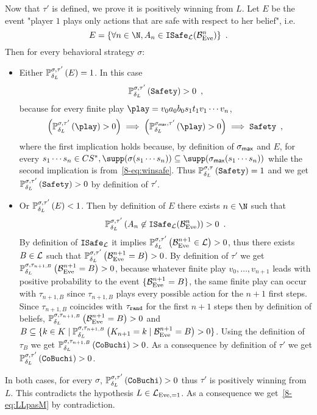 Now that $\tau'$ is defined, we prove it is positively winning from $L$.
Let $E$ be the event 
{"player $1$ plays only actions that are safe with respect to her belief", i.e.}
\[
E = \{ \forall n\in \N, A_n \in \Isafe_\LL(\belun^n)\}\enspace.
\]
Then for every behavioral strategy $\sigma$:
\begin{itemize}
  \item[\textbullet]
Either $\mathbb{P}^{\sigma,\tau'}_{\delta_L}\left({E}\right)=1$. In this case 
\[
\mathbb{P}^{\sigma,\tau'}_{\delta_L}\left({{\tt Safety}}\right)> 0\enspace,
\]
because for every {finite play $\play=v_0a_0b_0s_1t_1v_1\cdots v_n$,}
\[
\left(\probimp{\sigma,\tau'}{\delta_L}{\play} > 0\right)
\implies
\left(\probimp{\sigma_{\can},\tau'}{\delta_L}{\play} > 0\right)
\implies
\winsafe\enspace,
\]
where the first implication holds because, by definition of $\sigma_{\textsf{max}}$ and $E$,
for every $s_1\cdots s_n\in CS^*, \supp(\sigma(s_1\cdots s_n))\subseteq \supp(\sigma_{\can}(s_1\cdots s_n))$
while the second implication is from~\cref{8-eq:winsafe}.
Thus $\mathbb{P}^{\sigma,\tau}_{\delta_L}\left({{\tt Safety}}\right)= 1$ and we get
$\mathbb{P}^{\sigma,\tau'}_{\delta_L}\left({{\tt Safety}}\right) > 0$ by definition of
$\tau'$.
\item[\textbullet]
Or $\mathbb{P}^{\sigma,\tau'}_{\delta_L}\left({E}\right)<1$.
Then by definition of $E$ there exists $n\in\N$
such that 
\[
\mathbb{P}^{\sigma,\tau'}_{\delta_L}\left({A_n  \not\in
{\tt ISafe}_{\mathcal{L}}(\mathcal{B}_{\text{Eve}}^n)}\right)>0\enspace.
\]
{
By definition of ${\tt ISafe}_{\mathcal{L}}$ it implies
$\mathbb{P}^{\sigma,\tau'}_{\delta_L}\left({\mathcal{B}_{\text{Eve}}^{n+1}  \in \mathcal{L}}\right)>0$,
thus there exists $B\in \mathcal{L}$ such that
$\mathbb{P}^{\sigma,\tau'}_{\delta_L}\left({\mathcal{B}_{\text{Eve}}^{n+1} =B}\right)>0$.
By definition of $\tau'$ we get
$\mathbb{P}^{\sigma,\tau_{n+1,B}}_{\delta_L}\left({\mathcal{B}_{\text{Eve}}^{n+1} =B}\right)>0$,
because whatever finite play $v_0,\ldots, v_{n+1}$ leads with positive probability to
the event $\{\mathcal{B}_{\text{Eve}}^{n+1} =B\}$,
the same finite play can occur with 
$\tau_{n+1,B}$ since $\tau_{n+1,B}$ plays every possible action for the $n+1$ first steps.
Since $\tau_{n+1,B}$ coincides with $\tau_{\tt rand}$ for the first $n+1$ steps then
by definition of beliefs,
$\mathbb{P}^{\sigma,\tau_{n+1,B}}_{\delta_L}\left({\mathcal{B}_{\text{Eve}}^{n+1} =B}\right)>0$
and $B\subseteq \{ k\in K\mid \mathbb{P}^{\sigma,\tau_{n+1,B}}_{\delta_L}\left({K_{n+1}=k\mid \mathcal{B}_{\text{Eve}}^{n+1} =B}\right)>0\}$.
%
Using the definition of $\tau_B$ we get 
$\mathbb{P}^{\sigma,\tau_{n+1,B}}_{\delta_L}\left({{\tt CoBuchi}}\right)>0$.
}
As a consequence by definition of $\tau'$
we get  $ \mathbb{P}^{\sigma,\tau'}_{\delta_L}\left({{\tt CoBuchi}}\right)
>0 $.
\end{itemize}  
In both cases, for every $\sigma$,
$\mathbb{P}^{\sigma,\tau'}_{\delta_L}\left({{\tt CoBuchi} }\right) >0 $
thus $\tau'$ is positively winning from $L$.
This contradicts the
hypothesis $L\in \mathcal{L}_{\text{Eve},=1}$. As a consequence we get~\cref{8-eq:LLpasM} by contradiction.

